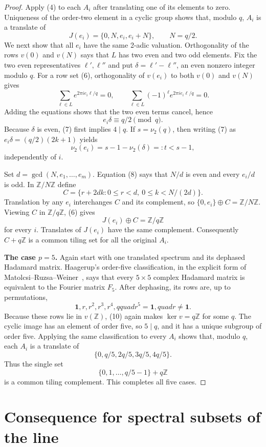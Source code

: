 \documentclass[11pt]{article}
\newcommand{\Z}{\mathbb Z}
\begin{document}
\begin{proof}
Apply (4) to each $A_i$ after translating one of its elements to zero.
Uniqueness of the order-two element in a cyclic group shows that, modulo
$q$, $A_i$ is a translate of
\[
 J(e_i)=\{0,N,e_i,e_i+N\},\qquad N=q/2.
 \tag{6}
\]
We next show that all $e_i$ have the same 2-adic valuation.  Orthogonality
of the rows $v(0)$ and $v(N)$ says that $L$ has two even and two odd
elements.  Fix the two even representatives $\ell',\ell''$ and put
$\delta=\ell'-\ell''$, an even nonzero integer modulo $q$.  For a row
set (6), orthogonality of $v(e_i)$ to both $v(0)$ and $v(N)$ gives
\[
 \sum_{\ell\in L}e^{2\pi i e_i\ell/q}=0,
 \qquad
 \sum_{\ell\in L}(-1)^\ell e^{2\pi i e_i\ell/q}=0.
\]
Adding the equations shows that the two even terms cancel, hence
\[
 e_i\delta\equiv q/2\pmod q.
 \tag{7}
\]
Because $\delta$ is even, (7) first implies $4\mid q$.  If
$s=\nu_2(q)$, then writing (7) as
$e_i\delta=(q/2)(2k+1)$ yields
\[
 \nu_2(e_i)=s-1-\nu_2(\delta)=:t<s-1,
 \tag{8}
\]
independently of $i$.

Set $d=\gcd(N,e_1,\ldots,e_m)$.  Equation (8) says that $N/d$ is even
and every $e_i/d$ is odd.  In $\Z/N\Z$ define
\[
 C=\{r+2dk:0\le r<d,\ 0\le k<N/(2d)\}.
 \tag{9}
\]
Translation by any $e_i$ interchanges $C$ and its complement, so
\(\{0,e_i\}\oplus C=\Z/N\Z\).  Viewing $C$ in $\Z/q\Z$, (6) gives
\[
 J(e_i)\oplus C=\Z/q\Z
\]
for every $i$.  Translates of $J(e_i)$ have the same complement.
Consequently $C+q\Z$ is a common tiling set for all the original $A_i$.

\medskip
\noindent\textbf{The case $p=5$.}
Again start with one translated spectrum and its dephased Hadamard
matrix.  Haagerup's order-five classification, in the explicit form of
Matolcsi--Ruzsa--Weiner~\cite[Proposition~2.1]{mrw}, says that every
$5\times5$ complex Hadamard matrix is equivalent to the Fourier matrix
$F_5$.  After dephasing, its rows are, up to permutations,
\[
 \mathbf1,r,r^2,r^3,r^4,qquad r^5=\mathbf1,quad r\ne\mathbf1.
 \tag{10}
\]
Because these rows lie in $v(\Z)$, (10) again makes $\ker v=q\Z$ for
some $q$.  The cyclic image has an element of order five, so $5\mid q$,
and it has a unique subgroup of order five.  Applying the same
classification to every $A_i$ shows that, modulo $q$, each $A_i$ is a
translate of
\[
 \{0,q/5,2q/5,3q/5,4q/5\}.
\]
Thus the single set
\[
 \{0,1,\ldots,q/5-1\}+q\Z
\]
is a common tiling complement.  This completes all five cases.
\end{proof}

\section{Consequence for spectral subsets of the line}
\end{document}
